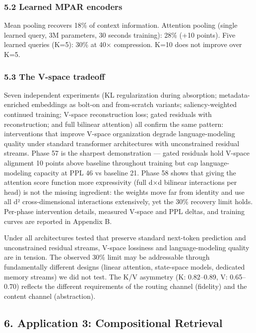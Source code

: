 \subsubsection{5.2 Learned MPAR encoders}\label{learned-mpar-encoders}

Mean pooling recovers 18\% of context information. Attention pooling (single learned query, 3M parameters, 30 seconds training): 28\% (+10 points). Five learned queries (K=5): 30\% at 40× compression. K=10 does not improve over K=5.

\subsubsection{5.3 The V-space tradeoff}\label{the-v-space-tradeoff}

Seven independent experiments (KL regularization during absorption; metadata-enriched embeddings as bolt-on and from-scratch variants; saliency-weighted continued training; V-space reconstruction loss; gated residuals with reconstruction; and full bilinear attention) all confirm the same pattern: interventions that improve V-space organization degrade language-modeling quality under standard transformer architectures with unconstrained residual streams. Phase 57 is the sharpest demonstration --- gated residuals hold V-space alignment 10 points above baseline throughout training but cap language-modeling capacity at PPL 46 vs baseline 21. Phase 58 shows that giving the attention score function more expressivity (full d×d bilinear interactions per head) is not the missing ingredient: the weights move far from identity and use all d² cross-dimensional interactions extensively, yet the 30\% recovery limit holds. Per-phase intervention details, measured V-space and PPL deltas, and training curves are reported in Appendix B.

Under all architectures tested that preserve standard next-token prediction and unconstrained residual streams, V-space lossiness and language-modeling quality are in tension. The observed 30\% limit may be addressable through fundamentally different designs (linear attention, state-space models, dedicated memory streams) we did not test. The K/V asymmetry (K: 0.82--0.89, V: 0.65--0.70) reflects the different requirements of the routing channel (fidelity) and the content channel (abstraction).

\subsection{6. Application 3: Compositional Retrieval}\label{application-3-compositional-retrieval}

